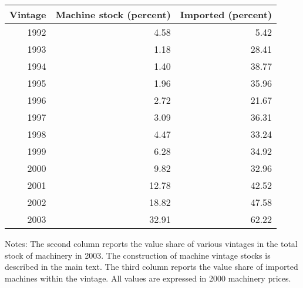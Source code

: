 \begin{tabular}{rrr}
\hline \hline
 Vintage &  Machine stock (percent) &  Imported (percent) \\
\hline

1992 & 4.58 & 5.42\\
1993 & 1.18 & 28.41\\
1994 & 1.40 & 38.77\\
1995 & 1.96 & 35.96\\
1996 & 2.72 & 21.67\\
1997 & 3.09 & 36.31\\
1998 & 4.47 & 33.24\\
1999 & 6.28 & 34.92\\
2000 & 9.82 & 32.96\\
2001 & 12.78 & 42.52\\
2002 & 18.82 & 47.58\\
2003 & 32.91 & 62.22\\
\hline \hline
\end{tabular}
\begin{tablenotes}
\item \footnotesize Notes: The second column reports the value share of various vintages in the total stock of machinery in 2003. The construction of machine vintage stocks is described in the main text. The third column reports the value share of imported machines within the vintage. All values are expressed in 2000 machinery prices.
\end{tablenotes}